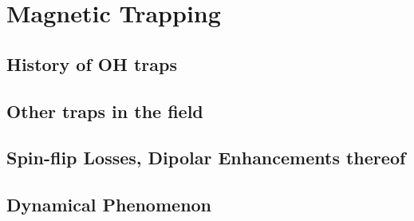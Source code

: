 \chapter{Magnetic Trapping}

\section{History of OH traps}

\section{Other traps in the field}

\section{Spin-flip Losses, Dipolar Enhancements thereof}

\section{Dynamical Phenomenon}